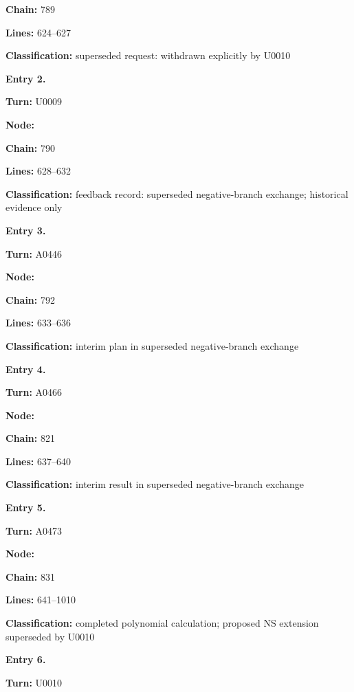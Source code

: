 \textbf{Chain:} 789

\textbf{Lines:} 624--627

\textbf{Classification:} superseded request: withdrawn explicitly by
U0010


\textbf{Entry 2.}

\textbf{Turn:} U0009

\textbf{Node:} \protect{}

\textbf{Chain:} 790

\textbf{Lines:} 628--632

\textbf{Classification:} feedback record: superseded negative-branch
exchange; historical evidence only


\textbf{Entry 3.}

\textbf{Turn:} A0446

\textbf{Node:} \protect{}

\textbf{Chain:} 792

\textbf{Lines:} 633--636

\textbf{Classification:} interim plan in superseded negative-branch
exchange


\textbf{Entry 4.}

\textbf{Turn:} A0466

\textbf{Node:} \protect{}

\textbf{Chain:} 821

\textbf{Lines:} 637--640

\textbf{Classification:} interim result in superseded negative-branch
exchange


\textbf{Entry 5.}

\textbf{Turn:} A0473

\textbf{Node:} \protect{}

\textbf{Chain:} 831

\textbf{Lines:} 641--1010

\textbf{Classification:} completed polynomial calculation; proposed NS
extension superseded by U0010


\textbf{Entry 6.}

\textbf{Turn:} U0010

